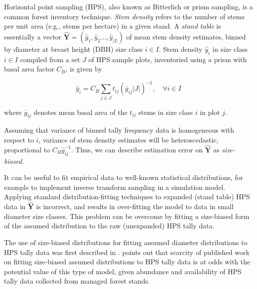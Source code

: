 \documentclass{foresj}
\begin{document}
Horizontal point sampling (HPS), also known as Bitterlich \citep{bitterlich1947winkelzahlmessung} or prism sampling, is a common forest inventory technique. 
\emph{Stem density} refers to the number of stems per unit area (e.g.,
stems per hectare) in a given stand. 
A \emph{stand table} is essentially a vector $\bm{\hat{Y}} = (\hat{y}_1, \hat{y}_2... , \hat{y}_{|I|})$ of mean stem density estimates, binned by diameter at breast height (DBH) size class $i \in I$. 
Stem density $\hat{y}_i$ in size class $i \in I$ compiled from a set $J$ of HPS sample plots, inventoried using a prism with basal area factor $C_B$, is given by

\begin{equation}
\hat{y}_i = C_B \sum_{j \in J} t_{ij}\left(\bar{g}_{ij}|J|\right)^{-1}, \quad \forall i \in I
\end{equation}

where $\bar{g}_{ij}$ denotes mean basal area of the $t_{ij}$ stems in size class $i$ in plot $j$.

Assuming that variance of binned tally frequency data is homogeneous with respect to $i$, variance of stem density estimates will be heteroscedastic, proportional to $C_B\bar{g}_{ij}^{-1}$. 
Thus, we can describe estimation error on $\bm{\hat{Y}}$ as \emph{size-biased}.

It can be useful to fit empirical data to well-known statistical
distributions, for example to implement inverse transform sampling \citep{devroye1986nonuniform} in
a simulation model. 
Applying standard distribution-fitting techniques to expanded (stand
table) HPS data in $\bm{\hat{Y}}$ is incorrect, and results in
over-fitting the model to data in small diameter size classes.
This problem can be overcome by fitting a size-biased form of the
assumed distribution to the raw (unexpanded) HPS tally data. 

The use of size-biased distributions for fitting assumed diameter
distributions to HPS tally data was first described in
\citet{vandeusen1986fitting}.
\citet{gove2000some} points out that scarcity of published
work on fitting size-biased assumed distributions to HPS tally data is at odds with
the potential value of this type of model, given abundance and
availability of HPS tally data collected from managed forest stands.
\end{document}
